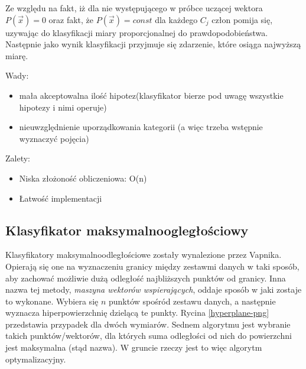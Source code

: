 \documentclass[12pt,a4paper,oneside]{report} %
\begin{document}
Ze względu na fakt, iż dla nie występującego w próbce uczącej wektora $P(\vec{x}) = 0$ oraz fakt, że $P(\vec{x})=const$ dla każdego $C_j$ człon pomija się, uzywając do klasyfikacji miary proporcjonalnej do prawdopodobieństwa. Następnie jako wynik klasyfikacji przyjmuje się zdarzenie, które osiąga najwyższą miarę.\par
\vspace{0.5cm}
Wady:\par
\begin{itemize}
\item mała akceptowalna ilość hipotez(klasyfikator bierze pod uwagę wszystkie hipotezy i nimi operuje)
\item nieuwzględnienie uporządkowania kategorii (a więc trzeba wstępnie wyznaczyć pojęcia)
\end{itemize}\par
Zalety:\par
\begin{itemize}
\item Niska złożoność obliczeniowa: O(n)
\item Łatwość implementacji
\end{itemize}\par






\subsection{Klasyfikator maksymalnoogległościowy}

Klasyfikatory maksymalnoodległościowe zostały wynalezione przez Vapnika. Opierają się one na wyznaczeniu granicy między zestawmi danych w taki sposób, aby zachować możliwie dużą odległość najbliższych punktów od granicy. Inna nazwa tej metody, \emph{maszyna wektorów wspierających}, oddaje sposób w jaki zostaje to wykonane. Wybiera się $n$ punktów spośród zestawu danych, a następnie wyznacza hiperpowierzchnię dzielącą te punkty. Rycina \ref{hyperplane-png} przedstawia przypadek dla dwóch wymiarów. Sednem algorytmu jest wybranie takich punktów/wektorów, dla których suma odległości od nich do powierzchni jest maksymalna (stąd nazwa). W gruncie rzeczy jest to więc algorytm optymalizacyjny. \par
\end{document}
